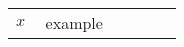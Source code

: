 \begin{center}
\begin{longtable}{p{0.15\linewidth} p{0.7\linewidth}} 
  $x$ & example \\

\end{longtable}
\end{center}